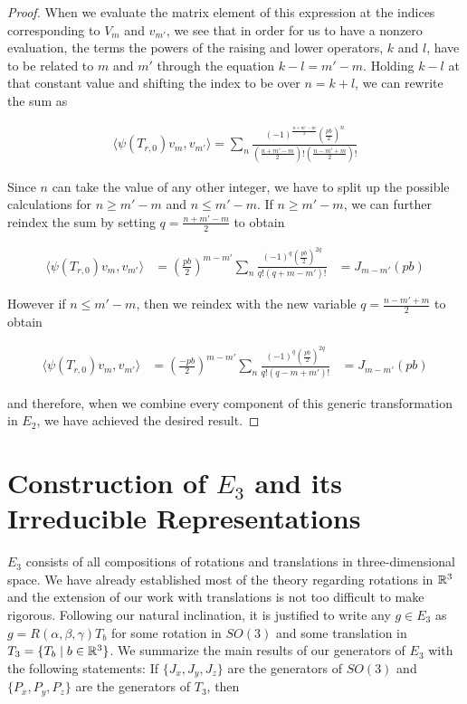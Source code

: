 \begin{proof}
When we evaluate the matrix element of this expression at the indices corresponding to $V_m$ and $v_{m'}$, we see that in order for us to have a nonzero evaluation, the terms the powers of the raising and lower operators, $k$ and $l$, have to be related to $m$ and $m'$ through the equation $k-l=m'-m$. Holding $k-l$ at that constant value and shifting the index to be over $n=k+l$, we can rewrite the sum as

\begin{equation}
\begin{aligned}
 \langle \psi(T_{r,0})v_m , v_{m'} \rangle = \sum_n \frac{(-1)^\frac{n+m'-m}{2}(\frac{pb}{2})^n}{(\frac{n+m'-m}{2})!(\frac{n-m'+m}{2})!}
\end{aligned}
\end{equation}

Since $n$ can take the value of any other integer, we have to split up the possible calculations for $n\geq m'-m$ and $n\leq m'-m$. If $n\geq m'-m$, we can further reindex the sum by setting $q=\frac{n+m'-m}{2}$ to obtain

\begin{equation}
\begin{aligned}
 \langle \psi(T_{r,0})v_m , v_{m'} \rangle &= \left(\frac{pb}{2}\right)^{m-m'}\sum_n \frac{(-1)^q(\frac{pb}{2})^{2q}}{q!(q+m-m')!} &= J_{m-m'}(pb)
\end{aligned}
\end{equation}

However if $n\leq m'-m$, then we reindex with the new variable $q =\frac{n-m'+m}{2}$ to obtain 

\begin{equation}
\begin{aligned}
 \langle \psi(T_{r,0})v_m , v_{m'} \rangle &= \left(\frac{-pb}{2}\right)^{m-m'}\sum_n \frac{(-1)^q(\frac{pb}{2})^{2q}}{q!(q-m+m')!} &= J_{m-m'}(pb)
\end{aligned}
\end{equation}

and therefore, when we combine every component of this generic transformation in $E_2$, we have achieved the desired result. \end{proof}

\section{Construction of $E_3$ and its Irreducible Representations}

$E_3$ consists of all compositions of rotations and translations in three-dimensional space. We have already established most of the theory regarding rotations in $\mathbb{R}^3$ and the extension of our work with translations is not too difficult to make rigorous. Following our natural inclination, it is justified to write any $g\in E_3$ as  $g = R(\alpha,\beta,\gamma)T_b$ for some rotation in $SO(3)$ and some translation in $T_3 = \{T_b \mid b\in\mathbb{R}^3\}$. We summarize the main results of our generators of $E_3$ with the following statements: If $\{J_x,J_y,J_z\}$ are the generators of $SO(3)$ and $\{P_x,P_y,P_z\}$ are the generators of $T_3$, then



